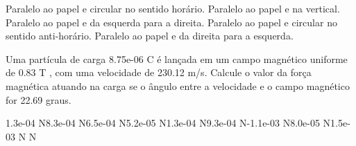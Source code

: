 \documentclass[12pt, addpoints]{exam}
\begin{document}
\begin{questions}
\begin{multicols*}{2}
\begin{choices}
\choice Paralelo ao papel e circular no sentido horário. 
\choice Paralelo ao papel e na vertical. 
\choice Paralelo ao papel e da esquerda para a direita. 
\choice Paralelo ao papel e circular no sentido anti-horário. 
\choice Paralelo ao papel e da direita para a esquerda. 
\end{choices}
\question Uma partícula de carga 8.75e-06 C é lançada em um campo magnético uniforme de    0.83 T , com uma velocidade de 230.12 m/s. Calcule o valor da força magnética atuando na carga se o ângulo entre a velocidade e o campo magnético for   22.69 graus.

\begin{oneparchoices}
\choice 1.3e-04 N\choice 8.3e-04 N\choice 6.5e-04 N\choice 5.2e-05 N\choice 1.3e-04 N\choice 9.3e-04 N\choice -1.1e-03 N\choice 8.0e-05 N\choice 1.5e-03 N N
\end{oneparchoices}\end{multicols*}
\end{questions}
\newpage
\end{document}
